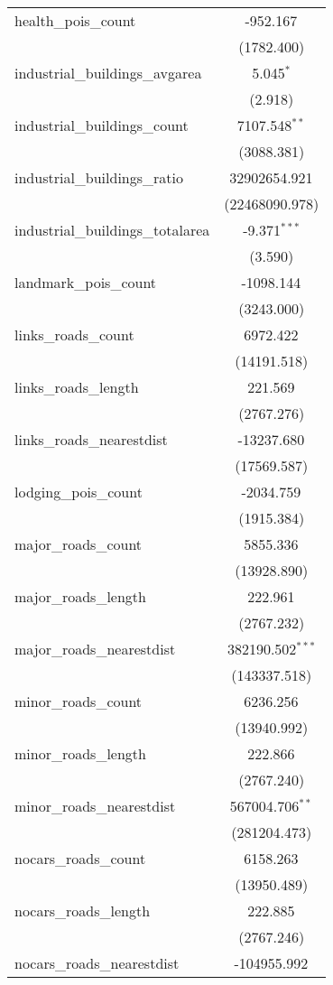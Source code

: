 \begin{table}[!htbp]
\begin{tabular}{@{\extracolsep{5pt}}lc}
 health_pois_count & -952.167$^{}$ \\
  & (1782.400) \\
 industrial_buildings_avgarea & 5.045$^{*}$ \\
  & (2.918) \\
 industrial_buildings_count & 7107.548$^{**}$ \\
  & (3088.381) \\
 industrial_buildings_ratio & 32902654.921$^{}$ \\
  & (22468090.978) \\
 industrial_buildings_totalarea & -9.371$^{***}$ \\
  & (3.590) \\
 landmark_pois_count & -1098.144$^{}$ \\
  & (3243.000) \\
 links_roads_count & 6972.422$^{}$ \\
  & (14191.518) \\
 links_roads_length & 221.569$^{}$ \\
  & (2767.276) \\
 links_roads_nearestdist & -13237.680$^{}$ \\
  & (17569.587) \\
 lodging_pois_count & -2034.759$^{}$ \\
  & (1915.384) \\
 major_roads_count & 5855.336$^{}$ \\
  & (13928.890) \\
 major_roads_length & 222.961$^{}$ \\
  & (2767.232) \\
 major_roads_nearestdist & 382190.502$^{***}$ \\
  & (143337.518) \\
 minor_roads_count & 6236.256$^{}$ \\
  & (13940.992) \\
 minor_roads_length & 222.866$^{}$ \\
  & (2767.240) \\
 minor_roads_nearestdist & 567004.706$^{**}$ \\
  & (281204.473) \\
 nocars_roads_count & 6158.263$^{}$ \\
  & (13950.489) \\
 nocars_roads_length & 222.885$^{}$ \\
  & (2767.246) \\
 nocars_roads_nearestdist & -104955.992$^{}$ \\

\end{tabular}
\end{table}

